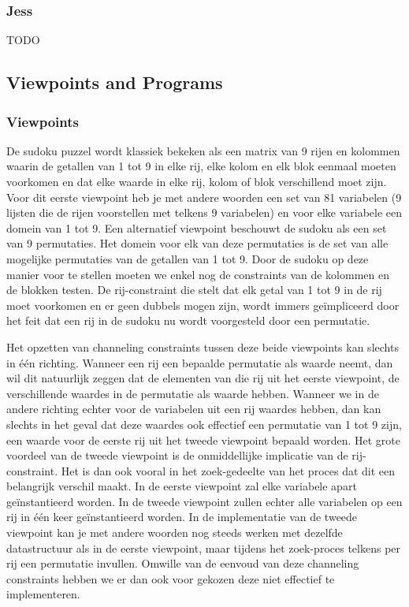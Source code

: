 \subsubsection{Jess}
TODO

\subsection{Viewpoints and Programs}
\subsubsection{Viewpoints}
De sudoku puzzel wordt klassiek bekeken als een matrix van 9 rijen en kolommen waarin de getallen van 1 tot 9 in elke
rij, elke kolom en elk blok eenmaal moeten voorkomen en dat elke waarde in elke rij, kolom of blok verschillend moet zijn.
Voor dit eerste viewpoint heb je met andere woorden een set van 81 variabelen (9 lijsten die de rijen voorstellen met
telkens 9 variabelen) en voor elke variabele een domein van 1 tot 9. Een alternatief viewpoint beschouwt
de sudoku als een set van 9 permutaties. Het domein voor elk van deze permutaties is de set van alle mogelijke permutaties
van de getallen van 1 tot 9. Door de sudoku op deze manier voor te stellen moeten we enkel nog de constraints van de kolommen
en de blokken testen. De rij-constraint die stelt dat elk getal van 1 tot 9 in de rij moet voorkomen en er geen dubbels
mogen zijn, wordt immers ge\"impliceerd door het feit dat een rij in de sudoku nu wordt voorgesteld door een permutatie.

Het opzetten van channeling constraints tussen deze beide viewpoints kan slechts in \'e\'en richting.
Wanneer een rij een bepaalde permutatie als waarde neemt, dan wil dit natuurlijk zeggen dat de elementen van die
rij uit het eerste viewpoint, de verschillende waardes in de permutatie als waarde hebben. Wanneer we in de
andere richting echter voor de variabelen uit een rij waardes hebben, dan kan slechts in het geval dat deze 
waardes ook effectief een permutatie van 1 tot 9 zijn, een waarde voor de eerste rij uit het tweede viewpoint bepaald worden.
Het grote voordeel van de tweede viewpoint is de onmiddellijke implicatie van de rij-constraint. Het is dan ook
vooral in het zoek-gedeelte van het proces dat dit een belangrijk verschil maakt. In de eerste viewpoint zal elke
variabele apart ge\"instantieerd worden. In de tweede viewpoint zullen echter alle variabelen op een rij in \'e\'en 
keer ge\"instantieerd worden. In de implementatie van de tweede viewpoint kan je met andere woorden nog steeds werken
met dezelfde datastructuur als in de eerste viewpoint, maar tijdens het zoek-proces telkens per rij een permutatie
invullen. Omwille van de eenvoud van deze channeling constraints hebben we er dan ook voor gekozen deze niet
effectief te implementeren.

